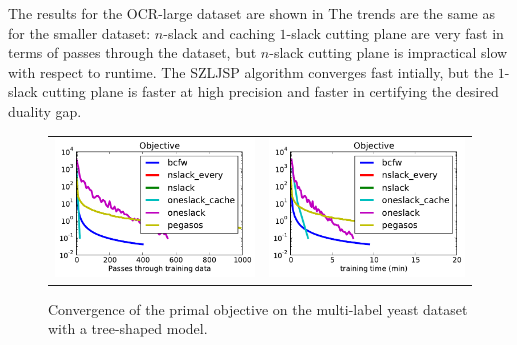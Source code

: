 The results for the OCR-large dataset are shown in 
The trends are the same as for the smaller dataset: $n$-slack and caching $1$-slack cutting plane are very fast
in terms of passes through the dataset, but $n$-slack cutting plane is impractical slow
with respect to runtime. The SZLJSP algorithm converges fast intially, but the $1$-slack cutting plane
is faster at high precision and faster in certifying the desired duality gap.
\begin{figure}
    \begin{tabu} to 
    \includegraphics[width=\linewidth]{evaluation/images/yeast_tree}&%
    \includegraphics[width=\linewidth]{evaluation/images/yeast_tree_time}
    \end{tabu}
\caption{%
   Convergence of the primal objective on the multi-label yeast dataset with a tree-shaped model.
}
\end{figure}


